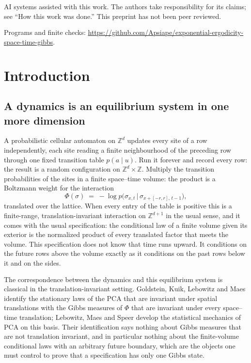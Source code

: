 \documentclass[11pt]{article}
\theoremstyle{plain}
\theoremstyle{definition}
\theoremstyle{remark}
\newcommand{\Z}{\mathbb{Z}}
\begin{document}
\begin{center}\small AI systems assisted with this work. The authors take responsibility for its claims; see ``How this work was done.'' This preprint has not been peer reviewed.\end{center}
\begin{center}\small Programs and finite checks: \url{https://github.com/Apsiape/exponential-ergodicity-space-time-gibbs}.\end{center}

\tableofcontents

\section{Introduction}

\subsection{A dynamics is an equilibrium system in one more dimension}
\label{sec:intro}

A probabilistic cellular automaton on $\Z^d$ updates every site of a row independently, each site reading a finite neighbourhood of the preceding row through one fixed transition table $p(a\mid u)$. Run it forever and record every row: the result is a random configuration on $\Z^d\times\Z$. Multiply the transition probabilities of the sites in a finite space--time volume: the product is a Boltzmann weight for the interaction
\[
\Phi(\sigma)\;=\;-\log p\bigl(\sigma_{x,t}\,\big|\,\sigma_{x+[-r,r],\,t-1}\bigr),
\]
translated over the lattice. When every entry of the table is positive this is a finite-range, translation-invariant interaction on $\Z^{d+1}$ in the usual sense, and it comes with the usual specification: the conditional law of a finite volume given its exterior is the normalized product of every translated factor that meets the volume. This specification does not know that time runs upward. It conditions on the future rows above the volume exactly as it conditions on the past rows below it and on the sides.

The correspondence between the dynamics and this equilibrium system is classical in the translation-invariant setting. Goldstein, Kuik, Lebowitz and Maes \cite{GKLM89} identify the stationary laws of the PCA that are invariant under spatial translations with the Gibbs measures of $\Phi$ that are invariant under every space--time translation; Lebowitz, Maes and Speer \cite{LMS90} develop the statistical mechanics of PCA on this basis. Their identification says nothing about Gibbs measures that are not translation invariant, and in particular nothing about the finite-volume conditional laws with an arbitrary future boundary, which are the objects one must control to prove that a specification has only one Gibbs state.
\end{document}

